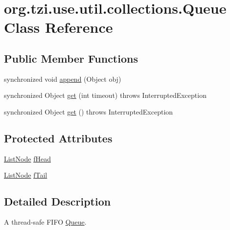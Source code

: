 \hypertarget{classorg_1_1tzi_1_1use_1_1util_1_1collections_1_1_queue}{\section{org.\-tzi.\-use.\-util.\-collections.\-Queue Class Reference}
\label{classorg_1_1tzi_1_1use_1_1util_1_1collections_1_1_queue}
}
\subsection*{Public Member Functions}
\begin{DoxyCompactItemize}
\item 
synchronized void \hyperlink{classorg_1_1tzi_1_1use_1_1util_1_1collections_1_1_queue_aa54000a4fb2ee1eff72df8134b131cbb}{append} (Object obj)
\item 
synchronized Object \hyperlink{classorg_1_1tzi_1_1use_1_1util_1_1collections_1_1_queue_af3fc30663e4e5bb02ac8c5551366518e}{get} (int timeout)  throws Interrupted\-Exception 
\item 
synchronized Object \hyperlink{classorg_1_1tzi_1_1use_1_1util_1_1collections_1_1_queue_a92e95cf93c34537c71f53d73ddcf3a53}{get} ()  throws Interrupted\-Exception 
\end{DoxyCompactItemize}
\subsection*{Protected Attributes}
\begin{DoxyCompactItemize}
\item 
\hyperlink{classorg_1_1tzi_1_1use_1_1util_1_1collections_1_1_list_node}{List\-Node} \hyperlink{classorg_1_1tzi_1_1use_1_1util_1_1collections_1_1_queue_ae5f99d8c4ea308f88237f286d7ba1680}{f\-Head}
\item 
\hyperlink{classorg_1_1tzi_1_1use_1_1util_1_1collections_1_1_list_node}{List\-Node} \hyperlink{classorg_1_1tzi_1_1use_1_1util_1_1collections_1_1_queue_a569a4efda2e8810ebe53176f9302c8b9}{f\-Tail}
\end{DoxyCompactItemize}


\subsection{Detailed Description}
A thread-\/safe F\-I\-F\-O \hyperlink{classorg_1_1tzi_1_1use_1_1util_1_1collections_1_1_queue}{Queue}.

